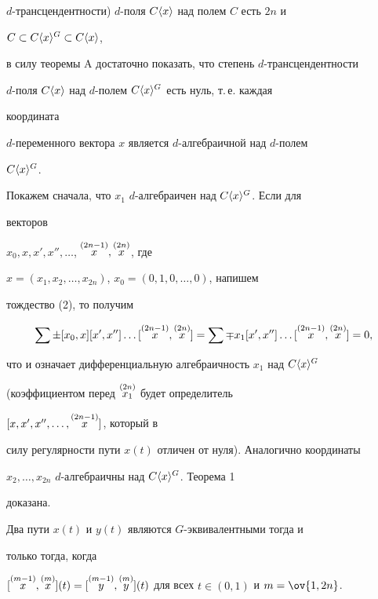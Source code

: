 $d$-трансцендентности) $d$-поля $C\langle x\rangle$ над полем $C$ есть $2n$ и 


$C\subset C\langle x\rangle^G\subset C\langle x\rangle$,


в силу теоремы A достаточно показать, что степень $d$-трансцендентности 


$d$-поля $C\langle x\rangle$ над $d$-полем $C\langle x\rangle^G$ есть нуль, т.\,е. каждая 


координата


$d$-переменного вектора $x$ является $d$-алгебраичной над $d$-полем 


$C\langle x\rangle^G$.





Покажем сначала, что $x_1$\; $d$-алгебраичен над $C\langle x\rangle^G$. Если для 


векторов


$x_0,x,x',x'',\dotsc$, $\overset{(2n-1)}{x}{},\overset{(2n)}{x}{}$, где 




$x=(x_1,x_2,\dotsc,x_{2n})$, $x_0=(0,1,0,\dotsc,0)$, напишем 


тождество (2), то получим


$$


\sum\pm[x_0,x][x',x'']\dotsc[\up{(2n-1)}{x},\up{(2n)}{x}]=


\sum\mp x_1[x',x'']\dotsc[\up{(2n-1)}{x},\up{(2n)}{x}]=0,


$$


что и означает дифференциальную алгебраичность $x_1$ над $C\langle x\rangle^G$


(коэффициентом перед $\overset{(2n)}{x_1}{}$ будет определитель


$[x,x',x'',\dotsc,\overset{(2n-1)}{x}{}]$, который в


силу регулярности пути $x(t)$ отличен от нуля). Аналогично координаты


$x_2,\dotsc,x_{2n}$\; $d$-алгебраичны над $C\langle x\rangle^G$. Теорема 1 


доказана. 





\begin{thm}


Два пути $x(t)$ и $y(t)$ являются $G$-эквивалентными тогда и


только тогда, когда


$[\up{(m-1)}{x},\up{(m)}{x}](t)=


[\up{(m-1)}{y},\up{(m)}{y}](t)$ для всех $t\in(0,1)$ и $m=\ov{1,2n}$.


\end{thm}






